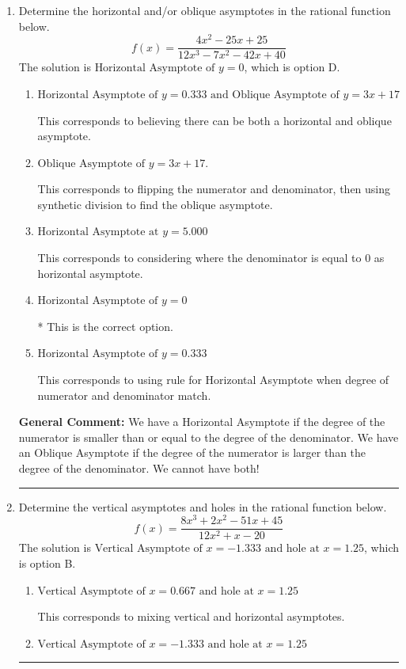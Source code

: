 \documentclass{extbook}[14pt]
\newcommand{\litem}[1]{\item #1

\rule{\textwidth}{0.4pt}}
\begin{document}
\begin{enumerate}\litem{
Determine the horizontal and/or oblique asymptotes in the rational function below.
\[ f(x) = \frac{4x^{2} -25 x + 25}{12x^{3} -7 x^{2} -42 x + 40} \]The solution is \( \text{Horizontal Asymptote of } y = 0 \), which is option D.\begin{enumerate}[label=\Alph*.]
\item \( \text{Horizontal Asymptote of } y = 0.333 \text{ and Oblique Asymptote of } y = 3x + 17 \)

This corresponds to believing there can be both a horizontal and oblique asymptote.
\item \( \text{Oblique Asymptote of } y = 3x + 17. \)

This corresponds to flipping the numerator and denominator, then using synthetic division to find the oblique asymptote.
\item \( \text{Horizontal Asymptote at } y = 5.000 \)

This corresponds to considering where the denominator is equal to 0 as horizontal asymptote.
\item \( \text{Horizontal Asymptote of } y = 0 \)

* This is the correct option.
\item \( \text{Horizontal Asymptote of } y = 0.333  \)

This corresponds to using rule for Horizontal Asymptote when degree of numerator and denominator match.
\end{enumerate}

\textbf{General Comment:} We have a Horizontal Asymptote if the degree of the numerator is smaller than or equal to the degree of the denominator. We have an Oblique Asymptote if the degree of the numerator is larger than the degree of the denominator. We cannot have both!
}
\litem{
Determine the vertical asymptotes and holes in the rational function below.
\[ f(x) = \frac{8x^{3} +2 x^{2} -51 x + 45}{12x^{2} +x -20} \]The solution is \( \text{Vertical Asymptote of } x = -1.333 \text{ and hole at } x = 1.25 \), which is option B.\begin{enumerate}[label=\Alph*.]
\item \( \text{Vertical Asymptote of } x = 0.667 \text{ and hole at } x = 1.25 \)

This corresponds to mixing vertical and horizontal asymptotes.
\item \( \text{Vertical Asymptote of } x = -1.333 \text{ and hole at } x = 1.25 \)


\end{enumerate}}
\end{enumerate}
\end{document}
